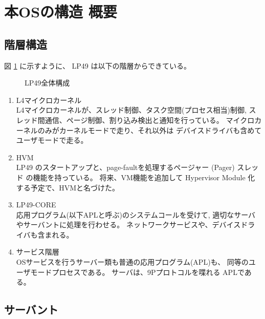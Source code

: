 \documentclass[draft]{ipsjpapers}
\begin{document}
\section{本OSの構造 概要}\label{sec:ITEM}

\subsection{階層構造}
      図 \ref{fig:LP49general} に示すように、
  LP49 は以下の階層からできている。
    
\begin{figure}[htb]
  \begin{center}
   \epsfxsize=400pt
    \caption{LP49全体構成}
    \label{fig:LP49general}
  \end{center}
\end{figure}


\begin{enumerate}
\item   L4マイクロカーネル  \\
    L4マイクロカーネルが、スレッド制御、タスク空間(プロセス相当)制御, 
    スレッド間通信、ページ制御、割り込み検出と通知を行っている。
    マイクロカーネルのみがカーネルモードで走り、それ以外は
    デバイスドライバも含めてユーザモードで走る。

    
\item  HVM \\
    LP49 のスタートアップと、page-faultを処理するページャー (Pager) スレッド 
    の機能を持っている。
    将来、VM機能を追加して Hypervisor Module 化する予定で、HVMと名づけた。

\item  LP49-CORE \\
    応用プログラム(以下APLと呼ぶ)のシステムコールを受けて, 
    適切なサーバやサーバントに処理を行わせる。 
    ネットワークサービスや、デバイスドライバも含まれる。
    
\item  サービス階層 \\
    OSサービスを行うサーバー類も普通の応用プログラム(APL)も、
    同等のユーザモードプロセスである。
    サーバは、9Pプロトコルを喋れる APLである。
\end{enumerate}    



\subsection{サーバント}
\end{document}
